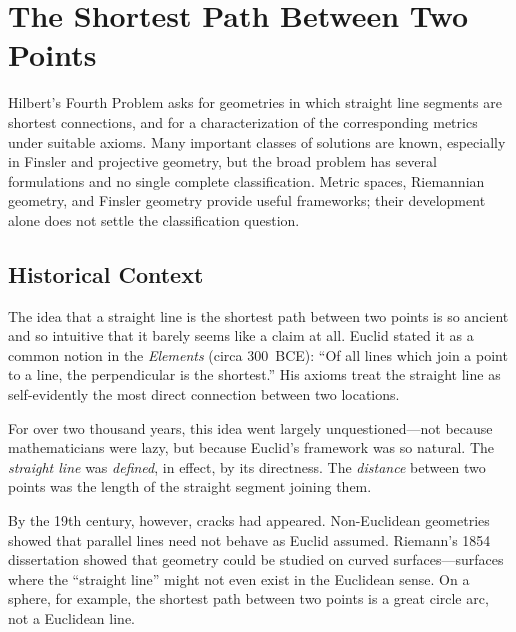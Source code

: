 
\chapter{The Shortest Path Between Two Points}

\begin{partiallybox}
Hilbert's Fourth Problem asks for geometries in which straight line segments are shortest connections, and for a characterization of the corresponding metrics under suitable axioms. Many important classes of solutions are known, especially in Finsler and projective geometry, but the broad problem has several formulations and no single complete classification. Metric spaces, Riemannian geometry, and Finsler geometry provide useful frameworks; their development alone does not settle the classification question.
\end{partiallybox}

\section{Historical Context}

The idea that a straight line is the shortest path between two points is so ancient and so intuitive that it barely seems like a claim at all. Euclid stated it as a common notion in the \emph{Elements} (circa 300~BCE): ``Of all lines which join a point to a line, the perpendicular is the shortest.'' His axioms treat the straight line as self-evidently the most direct connection between two locations.

For over two thousand years, this idea went largely unquestioned---not because mathematicians were lazy, but because Euclid's framework was so natural. The \emph{straight line} was \emph{defined}, in effect, by its directness. The \emph{distance} between two points was the length of the straight segment joining them.

By the 19th century, however, cracks had appeared. Non-Euclidean geometries showed that parallel lines need not behave as Euclid assumed. Riemann's 1854 dissertation showed that geometry could be studied on curved surfaces---surfaces where the ``straight line'' might not even exist in the Euclidean sense. On a sphere, for example, the shortest path between two points is a great circle arc, not a Euclidean line.

